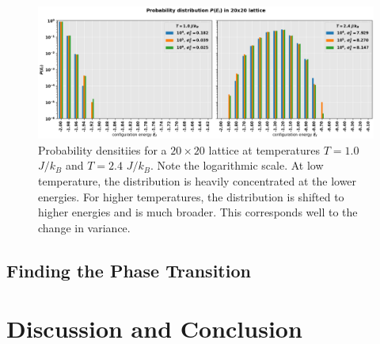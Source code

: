 \documentclass[]{article}
\begin{document}
\begin{figure}[!h]
	\centering
	\includegraphics[width=1\linewidth]{./figs/20x20-prob-dist.png}
	\caption{Probability densitiies for a $20 \times 20$ lattice at temperatures $T = 1.0$ $J/k_B$ and $T = 2.4$ $J/k_B$. Note the logarithmic scale. At low temperature, the distribution is heavily concentrated at the lower energies. For higher temperatures, the distribution is shifted to higher energies and is much broader. This corresponds well to the change in variance.}
	\label{fig:20x20-prob-dist}
\end{figure}

\subsection{Finding the Phase Transition} \label{sec:equilibration}






\clearpage
\section{Discussion and Conclusion} \label{sec:conclusion}




\end{document}
